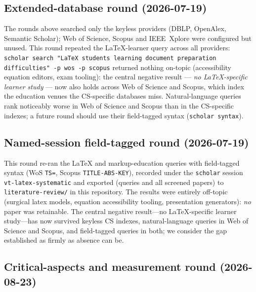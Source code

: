 \subsection{Extended-database round (2026-07-19)}

The rounds above searched only the keyless providers (DBLP, OpenAlex,
Semantic Scholar); Web of Science, Scopus and IEEE~Xplore were configured
but unused.
This round repeated the LaTeX-learner query across all providers:
\texttt{scholar search "LaTeX students learning document preparation
difficulties" -p wos -p scopus} returned nothing on-topic (accessibility
equation editors, exam tooling): the central negative result ---
\emph{no LaTeX-specific learner study} --- now also holds across Web of
Science and Scopus, which index the education venues the CS-specific
databases miss.
Natural-language queries rank noticeably worse in Web of Science and
Scopus than in the CS-specific indexes; a future round should use their
field-tagged syntax (\texttt{scholar syntax}).

\subsection{Named-session field-tagged round (2026-07-19)}

This round re-ran the LaTeX and markup-education queries with
field-tagged syntax (WoS \texttt{TS=}, Scopus \texttt{TITLE-ABS-KEY}),
recorded under the \texttt{scholar} session \texttt{vt-latex-systematic}
and exported (queries and all screened papers) to
\texttt{literature-review/} in this repository.
The results were entirely off-topic (surgical latex models, equation
accessibility tooling, presentation generators): \emph{no} paper was
retainable.
The central negative result---no LaTeX-specific learner study---has now
survived keyless CS indexes, natural-language queries in Web of Science
and Scopus, and field-tagged queries in both; we consider the gap
established as firmly as absence can be.

\subsection{Critical-aspects and measurement round (2026-08-23)}
\label{sec:protocol-measurement}

